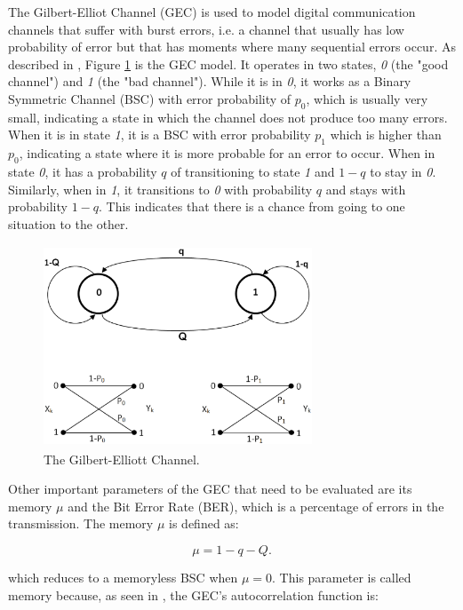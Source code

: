 {The Gilbert-Elliot Channel (GEC) is used to model digital communication channels that suffer with burst errors, i.e. a channel that usually has low probability of error but that has moments where many sequential errors occur. As described in \cite{mushkin.89}, Figure \ref{fig:gec} is the GEC model. It operates in two states, \textit{0} (the "good channel") and \textit{1} (the "bad channel"). While it is in \textit{0}, it works as a Binary Symmetric Channel (BSC) with error probability of $p_0$, which is usually very small, indicating a state in which the channel does not produce too many errors. When it is in state \textit{1}, it is a BSC with error probability $p_1$ which is higher than $p_0$, indicating a state where it is more probable for an error to occur. When in state \textit{0}, it has a probability $q$ of transitioning to state \textit{1} and $1-q$ to stay in \textit{0}. Similarly, when in \textit{1}, it transitions to \textit{0} with probability $q$ and stays with probability $1-q$. This indicates that there is a chance from going to one situation to the other.

\begin{figure}
\centering
\includegraphics[width=8cm, height=6cm]{Figuras/figgec.eps}
\caption{\label{fig:gec} The Gilbert-Elliott Channel.}
\end{figure}

Other important parameters of the GEC that need to be evaluated are its memory $\mu$ and the Bit Error Rate (BER), which is a percentage of errors in the transmission. The memory $\mu$ is defined as:

\begin{equation}
\mu = 1 - q - Q. \label{eq:mumemory}
\end{equation}

\noindent which reduces to a memoryless BSC when $\mu = 0$. This parameter is called memory because, as seen in \cite{mushkin.89}, the GEC's autocorrelation function is:

}
